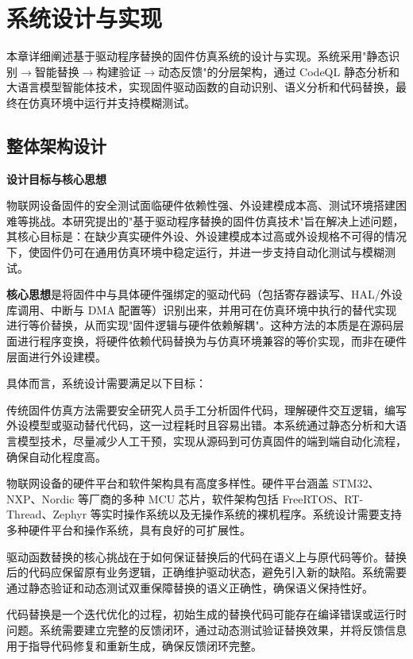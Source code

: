 \chapter{系统设计与实现}
\label{chap:design}

本章详细阐述基于驱动程序替换的固件仿真系统的设计与实现。系统采用"静态识别$\to$智能替换$\to$构建验证$\to$动态反馈"的分层架构，通过 CodeQL 静态分析和大语言模型智能体技术，实现固件驱动函数的自动识别、语义分析和代码替换，最终在仿真环境中运行并支持模糊测试。

\section{整体架构设计}
\label{sec:arch}

\textbf{设计目标与核心思想}

物联网设备固件的安全测试面临硬件依赖性强、外设建模成本高、测试环境搭建困难等挑战。本研究提出的"基于驱动程序替换的固件仿真技术"旨在解决上述问题，其核心目标是：在缺少真实硬件外设、外设建模成本过高或外设规格不可得的情况下，使固件仍可在通用仿真环境中稳定运行，并进一步支持自动化测试与模糊测试。

\textbf{核心思想}是将固件中与具体硬件强绑定的驱动代码（包括寄存器读写、HAL/外设库调用、中断与 DMA 配置等）识别出来，并用可在仿真环境中执行的替代实现进行等价替换，从而实现"固件逻辑与硬件依赖解耦"。这种方法的本质是在源码层面进行程序变换，将硬件依赖代码替换为与仿真环境兼容的等价实现，而非在硬件层面进行外设建模。

具体而言，系统设计需要满足以下目标：

传统固件仿真方法需要安全研究人员手工分析固件代码，理解硬件交互逻辑，编写外设模型或驱动替代代码，这一过程耗时且容易出错。本系统通过静态分析和大语言模型技术，尽量减少人工干预，实现从源码到可仿真固件的端到端自动化流程，确保自动化程度高。

物联网设备的硬件平台和软件架构具有高度多样性。硬件平台涵盖 STM32、NXP、Nordic 等厂商的多种 MCU 芯片，软件架构包括 FreeRTOS、RT-Thread、Zephyr 等实时操作系统以及无操作系统的裸机程序。系统设计需要支持多种硬件平台和操作系统，具有良好的可扩展性。

驱动函数替换的核心挑战在于如何保证替换后的代码在语义上与原代码等价。替换后的代码应保留原有业务逻辑，正确维护驱动状态，避免引入新的缺陷。系统需要通过静态验证和动态测试双重保障替换的语义正确性，确保语义保持性好。

代码替换是一个迭代优化的过程，初始生成的替换代码可能存在编译错误或运行时问题。系统需要建立完整的反馈闭环，通过动态测试验证替换效果，并将反馈信息用于指导代码修复和重新生成，确保反馈闭环完整。

